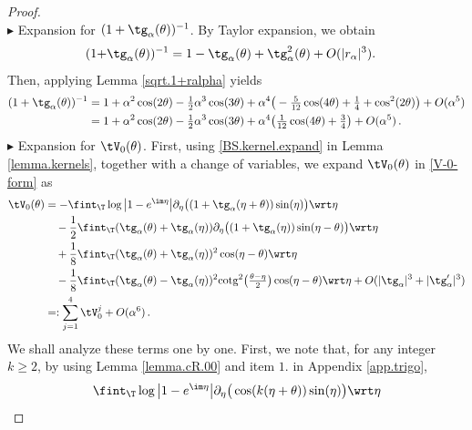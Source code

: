 \documentclass[a4paper,reqno,10pt]{article}
\newcommand{\pa}{\partial}
\begin{document}
\begin{proof}
\\[1mm]
\noindent $\blacktriangleright$ {\sc Expansion for $(1+\tg_{\alpha}(\theta))^{-1}$.}
	 By Taylor expansion, we obtain
	\begin{align*}
		(1 +& \tg_{\alpha}(\theta))^{-1}  = 1- \tg_{\alpha}(\theta) + \tg_{\alpha}^2(\theta) + O(|r_\alpha|^3).
	\end{align*}
Then, applying Lemma \ref{sqrt.1+ralpha} yields
\begin{align}\label{calcetto1}
		\nonumber (1 + \tg_{\alpha}(\theta))^{-1}  &= 1 + \alpha^2 \cos(2\theta) - \tfrac12 \alpha^3 \cos(3\theta) + \alpha^4 \big( -\tfrac{5}{12} \cos(4\theta)+\tfrac14 +\cos^2(2\theta) \big)  + O(\alpha^5) \\
		& = 1 + \alpha^2 \cos(2\theta) - \tfrac12 \alpha^3 \cos(3\theta) + \alpha^4 \big( \tfrac{1}{12}\cos(4\theta) + \tfrac{3}{4} \big) + O(\alpha^5) \,.
	\end{align}
\noindent $\blacktriangleright$ {\sc Expansion for $\tV_{0}(\theta)$.}
	 First, using \eqref{BS.kernel.expand} in Lemma \ref{lemma.kernels}, together with a change of variables, we expand $\tV_0(\theta)$ in \eqref{V-0-form} as
	 \begin{align}
	 		\tV_{0}(\theta) 
	 		& = -\fint_{\T} \log\big| 1- e^{\im\eta} \big| \pa_{\eta} \big( (1+\tg_{\alpha}(\eta+\theta)) \sin(\eta) \big) \wrt\eta \\
	 		&\quad - \frac{1}{2} \fint_{\T} (\tg_{\alpha}(\theta)+\tg_{\alpha}(\eta)) \pa_{\eta} \big( (1+\tg_{\alpha}(\eta)) \sin(\eta-\theta) \big) \wrt\eta \\
	 		& \quad + \frac{1}{8} \fint_{\T} (\tg_{\alpha}(\theta)+\tg_{\alpha}(\eta))^2 \cos(\eta-\theta) \wrt\eta \\
	 		& \quad -\frac{1}{8} \fint_{\T}  (\tg_{\alpha}(\theta)-\tg_{\alpha}(\eta))^2 {\rm cotg}^2\big(\tfrac{\theta-\eta}{2}\big)  \cos(\eta-\theta) \wrt\eta + O( |\tg_{\alpha}|^3 + |\tg_{\alpha}'|^3) \\
	 		& =: \sum_{j=1}^4\tV_{0}^{j} + O(\alpha^6) \,.
	 \end{align}
	 We shall analyze these terms one  by one. First, we note that, for any integer  $k\geq 2$, by using Lemma \ref{lemma.cR.00} and item $1.$ in Appendix \ref{app.trigo},
	 	\begin{align}
	 		&\fint_{\T} \log\big| 1- e^{\im\eta} \big| \pa_{\eta} \big( \cos(k(\eta+\theta)) \sin(\eta) \big) \wrt\eta \\

\end{align}
\end{proof}
\end{document}
